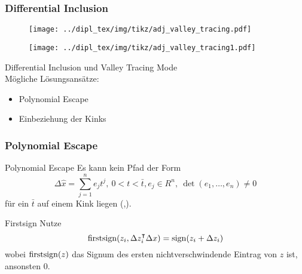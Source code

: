 \begin{frame}[<+->]
\frametitle{Differential Inclusion}
\centering
\begin{figure}
  \begin{minipage}{0.45\textwidth} 
	\texttt{[image: ../dipl\_tex/img/tikz/adj\_valley\_tracing.pdf]}
	\end{minipage}
	\hfill
	\begin{minipage}{0.45\textwidth}
	\texttt{[image: ../dipl\_tex/img/tikz/adj\_valley\_tracing1.pdf]}	
	\end{minipage}
	
\end{figure}
Differential Inclusion und Valley Tracing Mode \\
\pause
Mögliche Lösungsansätze:\hfill
\begin{itemize}
 \item Polynomial Escape
 \item Einbeziehung der Kinks
\end{itemize}
\end{frame}
\begin{frame}[<+->]
\frametitle{Polynomial Escape}
\begin{block}{Polynomial Escape}
 Es kann kein Pfad der Form
 \[
  \Delta \hat x = \sum_{j=1}^n e_j t^j, ~ 0<t<\bar t, e_j\in R^n,~ \det(e_1,\ldots,e_n) \neq 0
 \]
für ein $\bar t$ auf einem Kink liegen (\cite[Proposition 6]{monster},\cite[S.11]{plan}).
\end{block}
\begin{block}{Firstsign}
 Nutze \[
        \operatorname{firstsign}(z_i,\Delta z_i^\intercal \Delta x) =\operatorname{sign} (z_i + \Delta z_i)
       \]
wobei $\operatorname{firstsign}(z)$ das Signum des ersten nichtverschwindende Eintrag von $z$ ist, ansonsten 0.
\end{block}

\end{frame}
